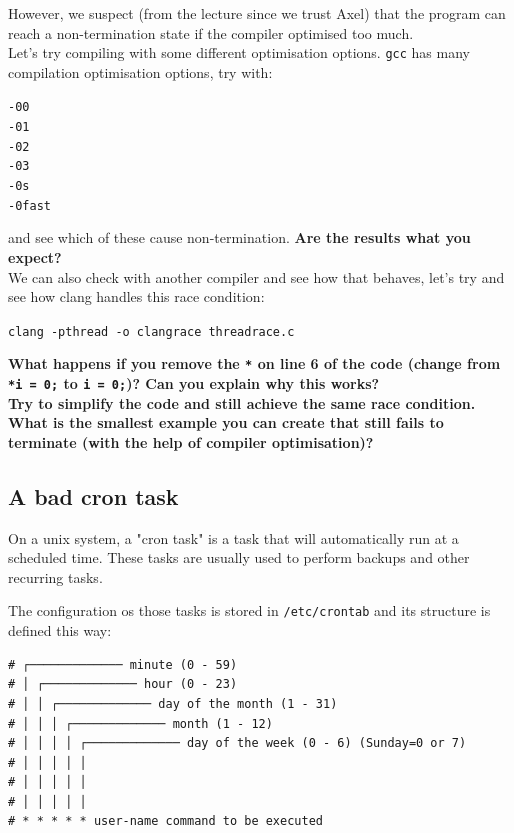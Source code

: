 \documentclass{article}
\begin{document}
\noindent However, we suspect (from the lecture since we trust Axel) that the program can reach a non-termination state if the compiler optimised too much.\\

\noindent Let’s try compiling with some different optimisation options. \lstinline{gcc} has many
compilation optimisation options, try with:
\begin{center}
    \lstinline{-00}\\
    \lstinline{-01}\\
    \lstinline{-02}\\
    \lstinline{-03}\\
    \lstinline{-0s}\\
    \lstinline{-0fast}
\end{center}
\noindent and see which of these cause non-termination. \textbf{Are the results what you expect?}\\

\noindent We can also check with another compiler and see how that behaves, let’s
try and see how clang handles this race condition:
\begin{center}
    \lstinline{clang -pthread -o clangrace threadrace.c}
\end{center}

\noindent \textbf{What happens if you remove the \lstinline{*} on line 6 of the code (change from \lstinline{*i = 0;} to \lstinline{i = 0;})? Can you explain why this works?}\\

\noindent \textbf{Try to simplify the code and still achieve the same race
condition. What is the smallest example you can create that still fails to
terminate (with the help of compiler optimisation)?}

\newpage

\subsection{A bad cron task}
On a unix system, a "cron task" is a task that will automatically run at a scheduled time. These tasks are usually used to perform backups and other recurring tasks.

\noindent The configuration os those tasks is stored in \lstinline{/etc/crontab} and its structure is defined this way:

\begin{lstlisting}
# ┌───────────── minute (0 - 59)
# │ ┌───────────── hour (0 - 23)
# │ │ ┌───────────── day of the month (1 - 31)
# │ │ │ ┌───────────── month (1 - 12)
# │ │ │ │ ┌───────────── day of the week (0 - 6) (Sunday=0 or 7)
# │ │ │ │ │                                   
# │ │ │ │ │
# │ │ │ │ │
# * * * * * user-name command to be executed
\end{lstlisting}
\end{document}
